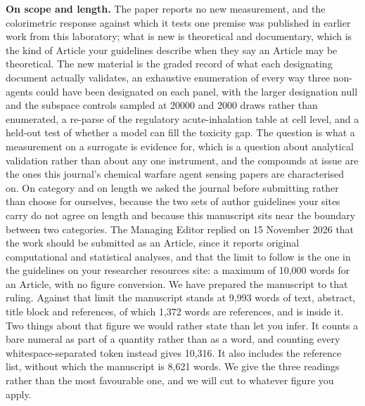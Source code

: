 \documentclass[11pt,a4paper]{article}
\begin{document}
\textbf{On scope and length.} The paper reports no new measurement, and the
colorimetric response against which it tests one premise was published in
earlier work from this laboratory; what is new is theoretical and documentary,
which is the kind of Article your guidelines describe when they say an Article
may be theoretical. The new material is the graded record of what each
designating document actually validates, an exhaustive enumeration of every
way three non-agents could have been designated on each panel, with the larger
designation null and the subspace controls sampled at 20000 and 2000 draws
rather than enumerated, a re-parse of the regulatory
acute-inhalation table at cell level, and a held-out test of whether a model
can fill the toxicity gap. The question is what a measurement on a
surrogate is evidence for, which is a question about analytical validation
rather than about any one instrument, and the compounds at issue are the ones
this journal's chemical warfare agent sensing papers are characterised on.
On category and on length we asked the journal before submitting rather than
choose for ourselves, because the two sets of author guidelines your sites
carry do not agree on length and because this manuscript sits near the boundary
between two categories. The Managing Editor replied on 15 November 2026 that
the work should be submitted as an Article, since it reports original
computational and statistical analyses, and that the limit to follow is the one
in the guidelines on your researcher resources site: a maximum of 10,000 words
for an Article, with no figure conversion. We have prepared the manuscript to
that ruling. Against that limit the manuscript stands at
9,993 words of text, abstract, title block and references, of which
1,372 words are references, and is inside it. Two things about that figure we
would rather state than let you infer. It counts a bare numeral as part of a
quantity rather than as a word, and counting every whitespace-separated token
instead gives 10,316. It also includes the reference list, without which the
manuscript is 8,621 words. We give the three readings rather than the most
favourable one, and we will cut to whatever figure you apply.
\end{document}
